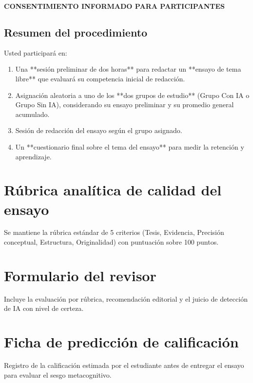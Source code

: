 \documentclass[12pt,a4paper,openany]{report}
\begin{document}
    \begin{center}
        {\sffamily\normalsize\bfseries\color{azulinstitucional} CONSENTIMIENTO INFORMADO PARA PARTICIPANTES\par}
    \end{center}
    
    \section*{Resumen del procedimiento}
    Usted participar\'a en:
    \begin{enumerate}
        \item Una **sesi\'on preliminar de dos horas** para redactar un **ensayo de tema libre** que evaluar\'a su competencia inicial de redacci\'on.
        \item Asignaci\'on aleatoria a uno de los **dos grupos de estudio** (Grupo Con IA o Grupo Sin IA), considerando su ensayo preliminar y su promedio general acumulado.
        \item Sesi\'on de redacci\'on del ensayo seg\'un el grupo asignado.
        \item Un **cuestionario final sobre el tema del ensayo** para medir la retenci\'on y aprendizaje.
    \end{enumerate}
    
    \chapter{R\'ubrica anal\'itica de calidad del ensayo}
    \label{anx:rubrica}
    
    Se mantiene la r\'ubrica est\'andar de 5 criterios (Tesis, Evidencia, Precisi\'on conceptual, Estructura, Originalidad) con puntuaci\'on sobre 100 puntos.
    
    \chapter{Formulario del revisor}
    \label{anx:revisor}
    
    Incluye la evaluaci\'on por r\'ubrica, recomendaci\'on editorial y el juicio de detecci\'on de IA con nivel de certeza.
    
    \chapter{Ficha de predicci\'on de calificaci\'on}
    \label{anx:calibracion}
    
    Registro de la calificaci\'on estimada por el estudiante antes de entregar el ensayo para evaluar el sesgo metacognitivo.
    
\end{document}

